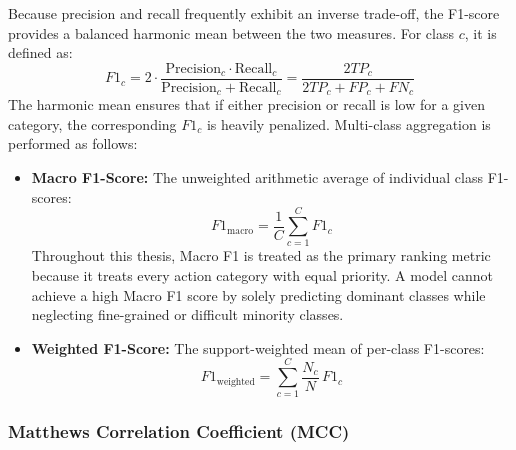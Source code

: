 Because precision and recall frequently exhibit an inverse trade-off, the F1-score provides a balanced harmonic mean between the two measures. For class $c$, it is defined as:
\begin{equation}
F1_c = 2 \cdot \frac{\text{Precision}_c \cdot \text{Recall}_c}{\text{Precision}_c + \text{Recall}_c} = \frac{2 TP_c}{2 TP_c + FP_c + FN_c}
\end{equation}
The harmonic mean ensures that if either precision or recall is low for a given category, the corresponding $F1_c$ is heavily penalized. Multi-class aggregation is performed as follows:
\begin{itemize}[leftmargin=*]
    \item \textbf{Macro F1-Score:} The unweighted arithmetic average of individual class F1-scores:
    \begin{equation}
    F1_{\text{macro}} = \frac{1}{C}\sum_{c=1}^{C} F1_c
    \end{equation}
    Throughout this thesis, Macro F1 is treated as the primary ranking metric because it treats every action category with equal priority. A model cannot achieve a high Macro F1 score by solely predicting dominant classes while neglecting fine-grained or difficult minority classes.
    \item \textbf{Weighted F1-Score:} The support-weighted mean of per-class F1-scores:
    \begin{equation}
    F1_{\text{weighted}} = \sum_{c=1}^{C} \frac{N_c}{N} \, F1_c
    \end{equation}
\end{itemize}

\subsubsection{Matthews Correlation Coefficient (MCC)}

